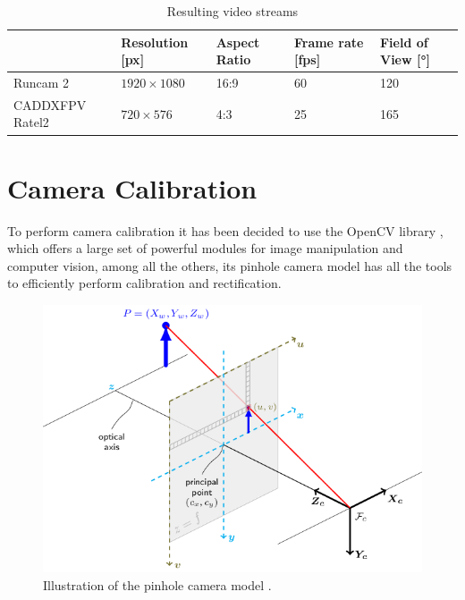 \begin{table}[h]
\centering
\caption{Resulting video streams}
\label{tab:cam_table}
\begin{tabular}{l|l|l|l|l|}
  \cline{2-5}
                                        & \cellcolor[HTML]{C0C0C0}Resolution {[}px{]} & \cellcolor[HTML]{C0C0C0}Aspect Ratio & \cellcolor[HTML]{C0C0C0}Frame rate {[}fps{]} & \cellcolor[HTML]{C0C0C0}Field of View {[}°{]} \\ \hline
  \multicolumn{1}{|l|}{Runcam 2}        &  \(1920\times1080\)                                   & 16:9                                 & 60                                           & 120                                           \\ \hline
  \multicolumn{1}{|l|}{CADDXFPV Ratel2} &  \(720\times576\)                                     & 4:3                                  & 25                                           & 165                                           \\ \hline
  \end{tabular}
\end{table}





\section {Camera Calibration}
\label{sec:camera_calib}

To perform camera calibration it has been decided to use the OpenCV library \cite{opencv}, which offers a large set of powerful modules for image manipulation and computer vision, among all the others, its pinhole camera model has all the tools to efficiently perform calibration and rectification.

\begin{figure}[h]
  \centering
  \includegraphics[scale=0.3]{figures/pinhole.png}
  \caption{Illustration of the pinhole camera model \cite{opencvcalib}.}
  \label{img:pinhole_img}
\end{figure}

